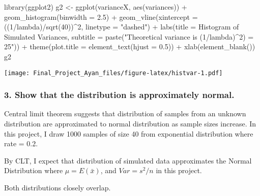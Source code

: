 \documentclass[
]{article}
\newenvironment{Shaded}{\begin{snugshade}}{\end{snugshade}}
\newcommand{\AttributeTok}[1]{\textcolor[rgb]{0.77,0.63,0.00}{#1}}
\newcommand{\DecValTok}[1]{\textcolor[rgb]{0.00,0.00,0.81}{#1}}
\newcommand{\FloatTok}[1]{\textcolor[rgb]{0.00,0.00,0.81}{#1}}
\newcommand{\FunctionTok}[1]{\textcolor[rgb]{0.00,0.00,0.00}{#1}}
\newcommand{\NormalTok}[1]{#1}
\newcommand{\OtherTok}[1]{\textcolor[rgb]{0.56,0.35,0.01}{#1}}
\newcommand{\SpecialCharTok}[1]{\textcolor[rgb]{0.00,0.00,0.00}{#1}}
\newcommand{\StringTok}[1]{\textcolor[rgb]{0.31,0.60,0.02}{#1}}
\begin{document}
\begin{Shaded}
\begin{Highlighting}[]
\FunctionTok{library}\NormalTok{(ggplot2)}
\NormalTok{g2 }\OtherTok{\textless{}{-}} \FunctionTok{ggplot}\NormalTok{(varianceX, }\FunctionTok{aes}\NormalTok{(variances)) }\SpecialCharTok{+} 
    \FunctionTok{geom\_histogram}\NormalTok{(}\AttributeTok{binwidth =} \FloatTok{2.5}\NormalTok{) }\SpecialCharTok{+} 
    \FunctionTok{geom\_vline}\NormalTok{(}\AttributeTok{xintercept =}\NormalTok{ ((}\DecValTok{1}\SpecialCharTok{/}\NormalTok{lambda)}\SpecialCharTok{/}\FunctionTok{sqrt}\NormalTok{(}\DecValTok{40}\NormalTok{))}\SpecialCharTok{\^{}}\DecValTok{2}\NormalTok{, }\AttributeTok{linetype =} \StringTok{"dashed"}\NormalTok{) }\SpecialCharTok{+}
    \FunctionTok{labs}\NormalTok{(}\AttributeTok{title =} \StringTok{\textquotesingle{}Histogram of Simulated Variances\textquotesingle{}}\NormalTok{,}
         \AttributeTok{subtitle =} \FunctionTok{paste}\NormalTok{(}\StringTok{"Theoretical variance is (1/lambda)\^{}2) = 25"}\NormalTok{)) }\SpecialCharTok{+} 
    \FunctionTok{theme}\NormalTok{(}\AttributeTok{plot.title =} \FunctionTok{element\_text}\NormalTok{(}\AttributeTok{hjust =} \FloatTok{0.5}\NormalTok{)) }\SpecialCharTok{+}
    \FunctionTok{xlab}\NormalTok{(}\FunctionTok{element\_blank}\NormalTok{())}
\NormalTok{g2}
\end{Highlighting}
\end{Shaded}

\texttt{[image: Final\_Project\_Ayan\_files/figure-latex/histvar-1.pdf]}

\hypertarget{show-that-the-distribution-is-approximately-normal.}{%
\subsubsection{3. Show that the distribution is approximately
normal.}\label{show-that-the-distribution-is-approximately-normal.}}

Central limit theorem suggests that distribution of samples from an
unknown distribution are approximated to normal distribution as sample
sizes increase. In this project, I draw 1000 samples of size 40 from
exponential distribution where rate = 0.2.

By CLT, I expect that distribution of simulated data approximates the
Normal Distribution where \(\mu = E(\bar{x})\), and \(Var = s^2/n\) in
this project.

Both distributions closely overlap.
\end{document}
